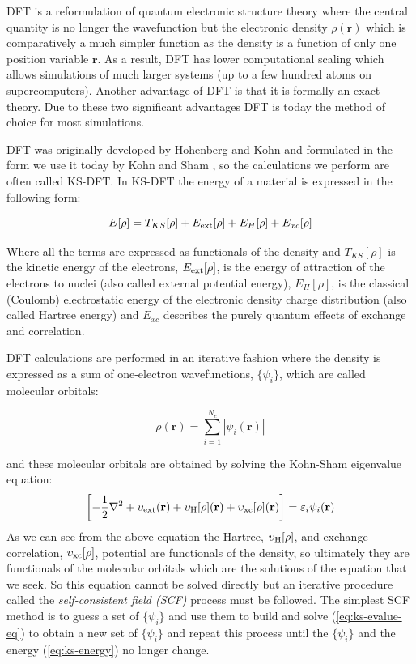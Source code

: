 \documentclass[../main.tex]{subfiles}
\begin{document}
DFT is a reformulation of quantum electronic structure theory where the central quantity is no longer the wavefunction but the electronic density $\rho(\mathbf{r})$ which is comparatively a much simpler function as the density is a function of only one position variable $\mathbf{r}$. As a result, DFT has lower computational scaling which allows simulations of much larger systems (up to a few hundred atoms on supercomputers). Another advantage of DFT is that it is formally an exact theory. Due to these two significant advantages DFT is today the method of choice for most simulations. 

DFT was originally developed by Hohenberg and Kohn \cite{parr,ph1964B864} and formulated in the form we use it today by Kohn and Sham \cite{wk1965A1133}, so the calculations we perform are often called KS-DFT. In KS-DFT the energy of a material is expressed in the following form:

\begin{equation}
    \label{eq:ks-energy}
    E[\rho] = T_{KS}[\rho] + E_{\rm ext}[\rho] + E_{H}[\rho] + E_{xc}[\rho]
\end{equation}

Where all the terms are expressed as functionals of the density and $T_{KS}[\rho]$ is the kinetic energy of the electrons, $ E_{\rm ext}[\rho]$, is the energy of attraction of the electrons to nuclei (also called external potential energy), $E_{H}[\rho]$, is the classical (Coulomb) electrostatic energy of the electronic density charge distribution (also called Hartree energy) and $E_{xc} $ describes the purely quantum effects of exchange and correlation. 

DFT calculations are performed in an iterative fashion where the density is expressed as a sum of one-electron wavefunctions, $\{ \psi_i \}$, which are called molecular orbitals:

\begin{equation}
    \rho(\mathbf{r}) = \sum_{i=1}^{N_e} | \psi_i(\mathbf{r})|
\end{equation}

and these molecular orbitals are obtained by solving the Kohn-Sham eigenvalue equation:
\begin{equation}
   \left [ -\frac{1}{2}\nabla^2 + \upsilon_{\rm ext}(\mathbf{r}) 
    + \upsilon_{\rm H}[\rho](\mathbf{r}) 
    + \upsilon_{\rm xc}[\rho](\mathbf{r}) \right ]
    = \varepsilon_i \psi_i(\mathbf{r}) 
    \label{eq:ks-evalue-eq}
\end{equation} 
As we can see from the above equation the Hartree, $\upsilon_{\rm H}[\rho]$, and exchange-correlation, $\upsilon_{\rm xc}[\rho]$, potential are functionals of the density, so ultimately they are functionals of the molecular orbitals 
which are the solutions of the equation that we seek. So this equation cannot be solved directly but an iterative procedure called the \emph{self-consistent field (SCF)} process must be followed. The simplest SCF method is to guess a set of $\{ \psi_i \}$ and use them to build and solve (\ref{eq:ks-evalue-eq}) to obtain a new set of $\{ \psi_i \}$ and repeat this process until the $\{ \psi_i \}$ and the energy 
(\ref{eq:ks-energy})
no longer change.
\end{document}
